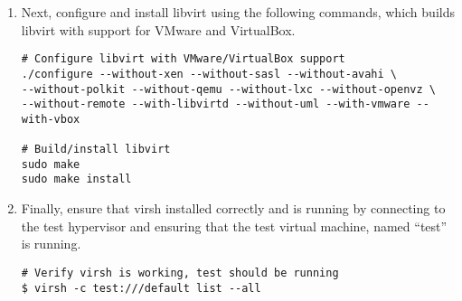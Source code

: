 \begin{enumerate}
\item	Next, configure and install libvirt using the following commands, which builds libvirt with support for VMware and
		VirtualBox.

\lstset{language=bash,caption=Configure and Install libvirt}
\begin{lstlisting}
# Configure libvirt with VMware/VirtualBox support
./configure --without-xen --without-sasl --without-avahi \
--without-polkit --without-qemu --without-lxc --without-openvz \
--without-remote --with-libvirtd --without-uml --with-vmware --with-vbox

# Build/install libvirt
sudo make
sudo make install
\end{lstlisting}	

\item 	Finally, ensure that virsh installed correctly and is running by connecting to the test hypervisor and ensuring 
		that the test virtual machine, named ``test'' is running.

\lstset{language=bash,caption=Verify virsh was Installed Properly}
\begin{lstlisting}
# Verify virsh is working, test should be running
$ virsh -c test:///default list --all
\end{lstlisting}
\end{enumerate}




\newpage
